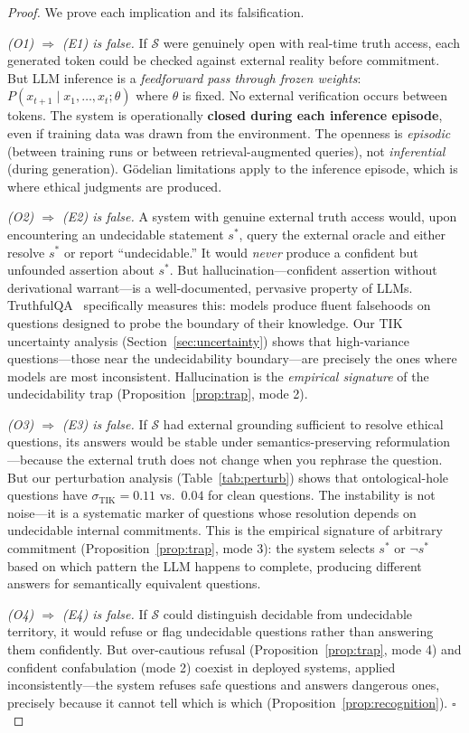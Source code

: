 \documentclass[11pt]{article}
\newcommand{\TIK}{\text{TIK}}
\begin{document}
\begin{proof}
We prove each implication and its falsification.

\textit{(O1) $\Rightarrow$ (E1) is false.}
If $\mathcal{S}$ were genuinely open with real-time truth access, each
generated token could be checked against external reality before commitment.
But LLM inference is a \textit{feedforward pass through frozen weights}:
$P(x_{t+1} \mid x_1, \ldots, x_t; \theta)$ where $\theta$ is fixed. No
external verification occurs between tokens. The system is operationally
\textbf{closed during each inference episode}, even if training data was
drawn from the environment. The openness is \textit{episodic} (between
training runs or between retrieval-augmented queries), not \textit{inferential}
(during generation). G\"{o}delian limitations apply to the inference episode,
which is where ethical judgments are produced.

\textit{(O2) $\Rightarrow$ (E2) is false.}
A system with genuine external truth access would, upon encountering an
undecidable statement $s^*$, query the external oracle and either resolve
$s^*$ or report ``undecidable.'' It would \textit{never} produce a confident
but unfounded assertion about $s^*$. But hallucination---confident assertion
without derivational warrant---is a well-documented, pervasive property of
LLMs. TruthfulQA~\citep{lin2021truthfulqa} specifically measures this: models
produce fluent falsehoods on questions designed to probe the boundary of their
knowledge. Our TIK uncertainty analysis (Section~\ref{sec:uncertainty}) shows
that high-variance questions---those near the undecidability boundary---are
precisely the ones where models are most inconsistent. Hallucination is the
\textit{empirical signature} of the undecidability trap
(Proposition~\ref{prop:trap}, mode 2).

\textit{(O3) $\Rightarrow$ (E3) is false.}
If $\mathcal{S}$ had external grounding sufficient to resolve ethical
questions, its answers would be stable under semantics-preserving
reformulation---because the external truth does not change when you rephrase
the question. But our perturbation analysis (Table~\ref{tab:perturb}) shows
that ontological-hole questions have $\sigma_{\TIK} = 0.11$ vs.\ $0.04$ for
clean questions. The instability is not noise---it is a systematic marker of
questions whose resolution depends on undecidable internal commitments.
This is the empirical signature of arbitrary commitment
(Proposition~\ref{prop:trap}, mode 3): the system selects $s^*$ or
$\neg s^*$ based on which pattern the LLM happens to complete, producing
different answers for semantically equivalent questions.

\textit{(O4) $\Rightarrow$ (E4) is false.}
If $\mathcal{S}$ could distinguish decidable from undecidable territory, it
would refuse or flag undecidable questions rather than answering them
confidently. But over-cautious refusal (Proposition~\ref{prop:trap}, mode 4)
and confident confabulation (mode 2) coexist in deployed systems, applied
inconsistently---the system refuses safe questions and answers dangerous
ones, precisely because it cannot tell which is which
(Proposition~\ref{prop:recognition}). \hfill $\square$
\end{proof}
\end{document}
